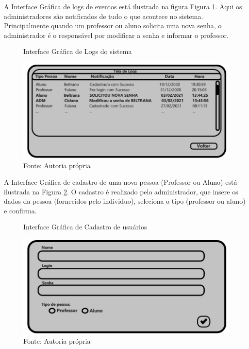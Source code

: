 \documentclass{utfpr-pg}
\begin{document}
    A Interface Gráfica de logs de eventos está ilustrada na figura Figura \ref{fig:12}. Aqui os administradores são notificados de tudo o que acontece no sistema. Principalmente quando um professor ou aluno solicita uma nova senha, o administrador é o responsável por modificar a senha e informar o professor.
    \begin{figure}[H]
            \centering
            \captionsetup{width=0.9\textwidth}
            \caption{Interface Gráfica de Logs do sistema}
            \includegraphics[width=\linewidth]{fotos/12.jpg}
            \caption*{Fonte: Autoria própria}
            \label{fig:12}
        \end{figure}
        
        A Interface Gráfica de cadastro de uma nova pessoa (Professor ou Aluno) está ilustrada na Figura \ref{fig:13}. O cadastro é realizado pelo administrador, que insere os dados da pessoa (fornecidos pelo individuo), seleciona o tipo (professor ou aluno) e confirma.
        \begin{figure}[H]
            \centering
            \captionsetup{width=0.9\textwidth}
            \caption{Interface Gráfica de Cadastro de usuários}
            \includegraphics[width=\linewidth]{fotos/13.jpg}
            \caption*{Fonte: Autoria própria}
            \label{fig:13}
        \end{figure}
        
\end{document}
